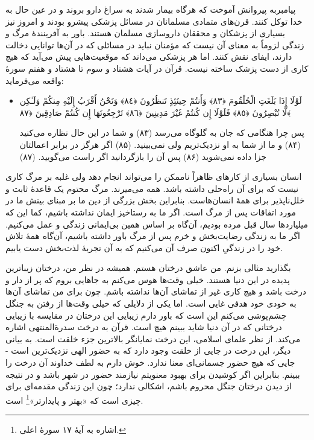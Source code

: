 پیامبر{}به پیروانش آموخت که هرگاه بیمار شدند به سراغ دارو بروند و در عین حال به خدا توکل کنند. قرن‌های متمادی مسلمانان در مسائل پزشکی پیشرو بودند و امروز نیز بسیاری از پزشکان و محققان داروسازی مسلمان هستند. باور به آفرینندهٔ مرگ و زندگی لزوماً به معنای آن نیست که مؤمنان نباید در مسائلی که در آن‌ها توانایی دخالت دارند، ایفای نقش کنند. اما هر پزشکی می‌داند که موقعیت‌هایی پیش می‌آید که هیچ کاری از دست پزشک ساخته نیست. قرآن در آیات هشتاد و سوم تا هشتاد و هفتم سورهٔ واقعه می‌فرماید:
\begin{itemize}
	\item[]
	{
		لَوْلَا إِذَا بَلَغَتِ الْحُلْقُومَ ﴿٨٣﴾ وَأَنتُمْ حِينَئِذٍ تَنظُرُونَ ﴿٨٤﴾ وَنَحْنُ أَقْرَبُ إِلَيْهِ مِنكُمْ وَلَـٰكِن لَّا تُبْصِرُونَ ﴿٨٥﴾ فَلَوْلَا إِن كُنتُمْ غَيْرَ مَدِينِينَ ﴿٨٦﴾ تَرْجِعُونَهَا إِن كُنتُمْ صَادِقِينَ ﴿٨٧﴾}
	
	{
		پس چرا هنگامی که جان به گلوگاه می‌رسد (۸۳) و شما در این حال نظاره می‌کنید (۸۴) و ما از شما به او نزدیک‌تریم ولی نمی‌بینید. (۸۵) اگر هرگز در برابر اعمالتان جزا داده نمی‌شوید (۸۶) پس آن  را بازگردانید اگر راست می‌گویید. (۸۷)}
\end{itemize}


انسان بسیاری از کارهای ظاهراً ناممکن را می‌تواند انجام دهد ولی غلبه بر مرگ کاری نیست که  برای آن راه‌حلی داشته باشد. همه می‌میرند. مرگ محتوم یک قاعدهٔ ثابت و خلل‌ناپذیر برای همهٔ انسان‌هاست. بنابراین بخش بزرگی از دین ما بر مبنای بینش ما در مورد اتفاقات پس از مرگ است. اگر ما به رستاخیز ایمان نداشته باشیم، کما این که میلیاردها سال قبل مرده بودیم، آن‌گاه بر اساس همین بی‌ایمانی زندگی و عمل می‌کنیم. اگر ما به زندگی رضایت‌بخش و خرم پس از مرگ باور داشته باشیم، آن‌گاه همهٔ تلاش خود را در زندگیِ اکنون صرف آن می‌کنیم که به آن تجربهٔ لذت‌بخش دست یابیم.

بگذارید مثالی بزنم. من عاشق درختان هستم. همیشه در نظر من، درختان زیباترین پدیده در این دنیا هستند. خیلی وقت‌ها هوس می‌کنم به جاهایی بروم که پر از دار و درخت باشد و هیچ کاری غیر از تماشای آن‌ها نداشته باشم. چون برای من تماشای آن‌ها به خودی خود هدفی غایی است. اما یکی از دلایلی که خیلی وقت‌ها از رفتن به جنگل چشم‌پوشی می‌کنم این است که باور دارم زیبایی این درختان در مقایسه با زیبایی درختانی که در آن دنیا شاید ببینم هیچ است. قرآن به درخت سدرةالمنتهی اشاره می‌کند. از نظر علمای اسلامی، این درخت نمایانگر بالاترین جزء خلقت است. به بیانی دیگر، این درخت در جایی از خلقت وجود دارد که به حضور الهی نزدیک‌ترین است - جایی که هیچ حضور جسمانی‌ای معنا ندارد. خوش دارم به لطف خداوند آن درخت را ببینم. بنابراین اگر کوشیدن برای بهبود معنویتم نیازمند حضور در شهر باشد و در نتیجه از دیدن درختان جنگل محروم باشم، اشکالی ندارد؛ چون این زندگی مقدمه‌ای برای چیزی است که «بهتر و پایدارتر»\footnote{اشاره به آیهٔ ۱۷ سورهٔ اعلی.} است.


